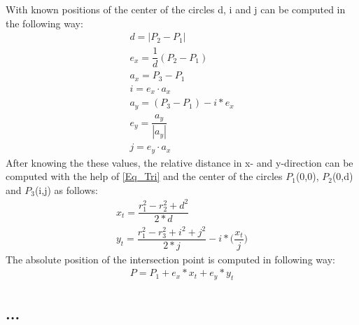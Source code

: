 With known positions of the center of the circles d, i and j can be computed in the following way:
\begin{align}
d = |P_2 - P_1| \\
e_x = \dfrac{1}{d}(P_2 - P_1) \\
a_x = P_3 - P_1 \\
i = e_x \cdot a_x \\
a_y = (P_3 - P_1) - i * e_x \\
e_y = \dfrac{a_y}{|a_y|} \\
j = e_y \cdot a_x
\end{align}
After knowing the these values, the relative distance in x- and y-direction can be computed with the help of \ref{Eq_Tri} and the center of the circles $P_1$(0,0), $P_2$(0,d) and $P_3$(i,j) as follows:
\begin{align}
x_t = \dfrac{r_1^2 - r_2^2 + d^2}{2*d} \\
y_t = \dfrac{r_1^2 - r_3^2 + i^2 + j^2}{2*j} - i* \bigg(\dfrac{x_t}{j}\bigg) 
\end{align}
The absolute position of the intersection point is computed in following way:
\begin{align}
P = P_1 + e_x * x_t + e_y * y_t 
\end{align}

\subsection{...}